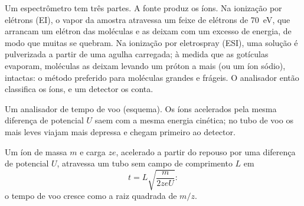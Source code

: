 Um espectrômetro tem três partes. A fonte produz os íons. Na ionização por elétrons (EI), o vapor da
amostra atravessa um feixe de elétrons de \qty{70}{eV}, que arrancam um elétron das moléculas e as
deixam com um excesso de energia, de modo que muitas se quebram. Na ionização por eletrospray (ESI), uma
solução é pulverizada a partir de uma agulha carregada; à medida que as gotículas evaporam, moléculas as
deixam levando um próton a mais (ou um íon sódio), intactas: o método preferido para moléculas grandes e
frágeis. O analisador então classifica os íons, e um detector os conta.

\begin{omfigure}
\par\vspace{4pt}

{\small Um analisador de tempo de voo (esquema). Os íons acelerados pela mesma diferença de potencial
$U$ saem com a mesma energia cinética; no tubo de voo os mais leves viajam mais depressa e chegam
primeiro ao detector.}
\end{omfigure}

\begin{proposition}\label{prop:b2:mass-spec-atomic:time-of-flight}
Um íon de massa $m$ e carga $ze$, acelerado a partir do repouso por uma diferença de potencial $U$,
atravessa um tubo sem campo de comprimento $L$ em
\begin{equation*}
t = L\sqrt{\frac{m}{2zeU}}:
\end{equation*}
o tempo de voo cresce como a raiz quadrada de $m/z$.
\end{proposition}

